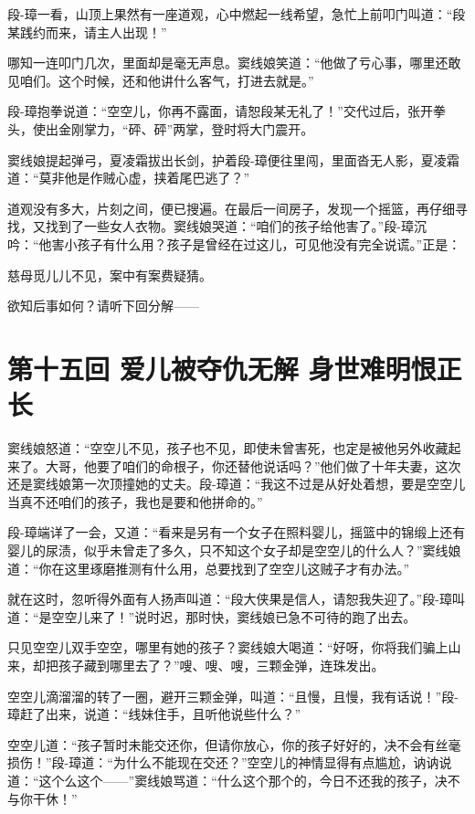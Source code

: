 \documentclass[12pt,oneside]{book}
\begin{document}
段-璋一看，山顶上果然有一座道观，心中燃起一线希望，急忙上前叩门叫道：``段某践约而来，请主人出现！''

哪知一连叩门几次，里面却是毫无声息。窦线娘笑道：``他做了亏心事，哪里还敢见咱们。这个时候，还和他讲什么客气，打进去就是。''

段-璋抱拳说道：``空空儿，你再不露面，请恕段某无礼了！''交代过后，张开拳头，使出金刚掌力，``砰、砰''两掌，登时将大门震开。

窦线娘提起弹弓，夏凌霜拔出长剑，护着段-璋便往里闯，里面沓无人影，夏凌霜道：``莫非他是作贼心虚，挟着尾巴逃了？''

道观没有多大，片刻之间，便已搜遍。在最后一间房子，发现一个摇篮，再仔细寻找，又找到了一些女人衣物。窦线娘哭道：``咱们的孩子给他害了。''段-璋沉吟：``他害小孩子有什么用？孩子是曾经在过这儿，可见他没有完全说谎。''正是：

慈母觅儿儿不见，案中有案费疑猜。

欲知后事如何？请听下回分解------

\chapter{第十五回 爱儿被夺仇无解
身世难明恨正长}\label{ux7b2cux5341ux4e94ux56de-ux7231ux513fux88abux593aux4ec7ux65e0ux89e3-ux8eabux4e16ux96beux660eux6068ux6b63ux957f}

窦线娘怒道：``空空儿不见，孩子也不见，即使未曾害死，也定是被他另外收藏起来了。大哥，他要了咱们的命根子，你还替他说话吗？''他们做了十年夫妻，这次还是窦线娘第一次顶撞她的丈夫。段-璋道：``我这不过是从好处着想，要是空空儿当真不还咱们的孩子，我也是要和他拼命的。''

段-璋端详了一会，又道：``看来是另有一个女子在照料婴儿，摇篮中的锦缎上还有婴儿的尿渍，似乎未曾走了多久，只不知这个女子却是空空儿的什么人？''窦线娘道：``你在这里琢磨推测有什么用，总要找到了空空儿这贼子才有办法。''

就在这时，忽听得外面有人扬声叫道：``段大侠果是信人，请恕我失迎了。''段-璋叫道：``是空空儿来了！''说时迟，那时快，窦线娘已急不可待的跑了出去。

只见空空儿双手空空，哪里有她的孩子？窦线娘大喝道：``好呀，你将我们骗上山来，却把孩子藏到哪里去了？''嗖、嗖、嗖，三颗金弹，连珠发出。

空空儿滴溜溜的转了一圈，避开三颗金弹，叫道：``且慢，且慢，我有话说！''段-璋赶了出来，说道：``线妹住手，且听他说些什么？''

空空儿道：``孩子暂时未能交还你，但请你放心，你的孩子好好的，决不会有丝毫损伤！''段-璋道：``为什么不能现在交还？''空空儿的神情显得有点尴尬，讷讷说道：``这个么这个------''窦线娘骂道：``什么这个那个的，今日不还我的孩子，决不与你干休！''
\end{document}
